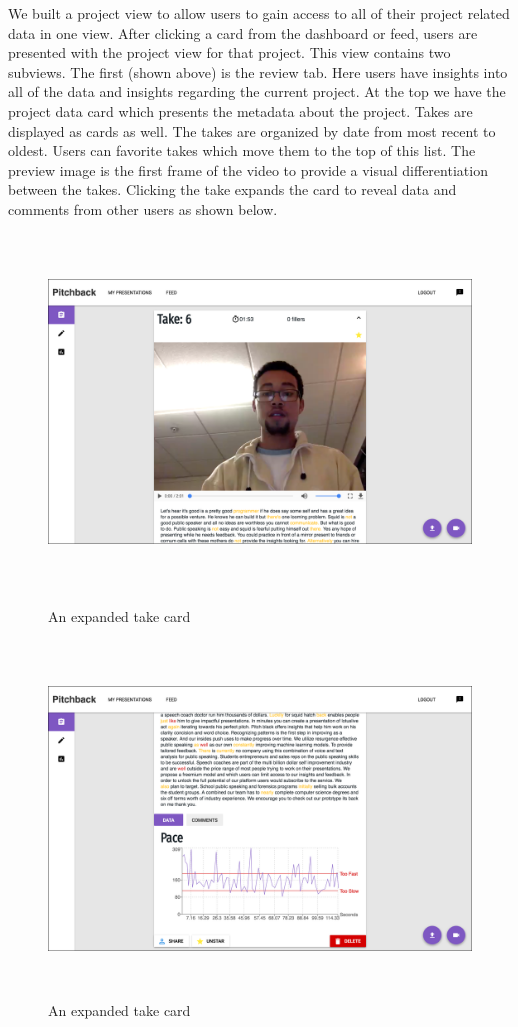 We built a project view to allow users to gain access to all of their project
related data in one view. After clicking a card from the dashboard or feed,
users are presented with the project view for that project. This view contains
two subviews. The first (shown above) is the review tab. Here users have
insights into all of the data and insights regarding the current project. At the
top we have the project data card which presents the metadata about the project.
Takes are displayed as cards as well. The takes are organized by date from most
recent to oldest. Users can favorite takes which move them to the top of this
list. The preview image is the first frame of the video to provide a visual
differentiation between the takes. Clicking the take expands the card to reveal
data and comments from other users as shown below.

\begin{figure}[H]
  \centering
   \includegraphics[height=3.7in]{figures/take_1}
   \caption{An expanded take card}
   \includegraphics[height=3.7in]{figures/take_2}
   \caption{An expanded take card}
\end{figure}


